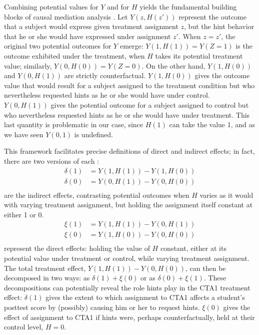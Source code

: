 \documentclass{article}\usepackage[]{graphicx}\usepackage[]{color}
\begin{document}
Combining potential values for $Y$ and for $H$ yields the fundamental
building blocks of causal mediation analysis
\citep[e.g.][]{vanderweele2015explanation,sales2017mediation}.
Let $Y(z,H(z'))$
represent the outcome that a subject would express given treatment
assignment $z$, but the hint behavior that he or she would have
expressed under assignment $z'$.
When $z=z'$, the original two potential outcomes for $Y$ emerge:
$Y(1,H(1))=Y(Z=1)$ is the outcome exhibited under the treatment, when $H$
takes its potential treatment value; similarly, $Y(0,H(0))=Y(Z=0)$. On
the other hand, $Y(1,H(0))$ and $Y(0,H(1))$ are strictly
counterfactual. $Y(1,H(0))$ gives the outcome value
that would result for a subject assigned to the treatment condition
but who nevertheless requested hints as he or she would have under
control. $Y(0,H(1))$ gives the potential outcome for a subject
assigned to control but who nevertheless requested hints as he or she
would have under treatment.
This last quantity is problematic in our case, since $H(1)$ can take the value 1,
and as we have seen $Y(0,1)$ is undefined.

This framework facilitates precise definitions of direct and indirect
effects; in fact, there are two versions of each \cite[e.g.][]{imai2011unpacking}:
\begin{align*}
\delta(1)&=Y(1,H(1))-Y(1,H(0))\\
\delta(0)&=Y(0,H(1))-Y(0,H(0))\\
\end{align*}
are the indirect effects, contrasting potential outcomes when $H$
varies as it would with varying treatment assignment, but holding the
assignment itself constant at either 1 or 0.
\begin{align*}
\xi(1)&=Y(1,H(1))-Y(0,H(1))\\
\xi(0)&=Y(1,H(0))-Y(0,H(0))\\
\end{align*}
represent the direct effects: holding the value of $H$ constant,
either at its potential value under treatment or control, while
varying treatment assignment.
The total treatment effect, $Y(1,H(1))-Y(0,H(0))$, can then be
decomposed in two ways: as $\delta(1)+\xi(0)$ or as
$\delta(0)+\xi(1)$.
These decompositions can potentially reveal the role hints play in the
CTA1 treatment effect: $\delta(1)$ gives the extent to which
assignment to CTA1 affects a student's posttest score by (possibly)
causing him or her to request hints.
$\xi(0)$ gives the effect of assignment to CTA1 if hints were,
perhaps counterfactually, held at their control level, $H=0$.
\end{document}
